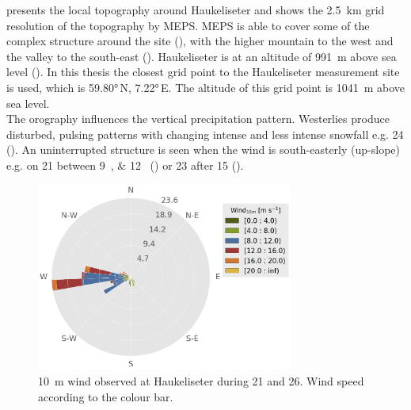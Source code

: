 \noindent
 presents the local topography around Haukeliseter and  shows the \SI{2.5}{\km} grid resolution of the topography by MEPS. 
MEPS is able to cover some of the complex structure around the site (), with the higher mountain to the west and the valley to the south-east (). Haukeliseter is at an altitude of \SI{991}{\metre} above sea level (). In this thesis the closest grid point to the Haukeliseter measurement site is used, which is \ang{59.80}\,N, \ang{7.22}\,E.  The altitude of this grid point is \SI{1041}{\metre} above sea level.
\\
The orography influences the vertical precipitation pattern. Westerlies produce disturbed, pulsing patterns with changing intense and less intense snowfall e.g. \SI{24}{\dec} (). An uninterrupted structure is seen when the wind is south-easterly (up-slope) e.g. on \num{21} between \SIlist{9;12}{\UTC} () or \SI{23}{\dec} after \SI{15}{\UTC} (). 
\\
\begin{figure}[ht!]
	\centering
	\includegraphics[width=0.75\textwidth]{./fig_windrose/20161221_26}
	\caption{\SI{10}{\metre} wind observed at Haukeliseter during \num{21} and \SI{26}{\dec}. Wind speed according to the colour bar.}\label{fig:windrose}
\end{figure}
